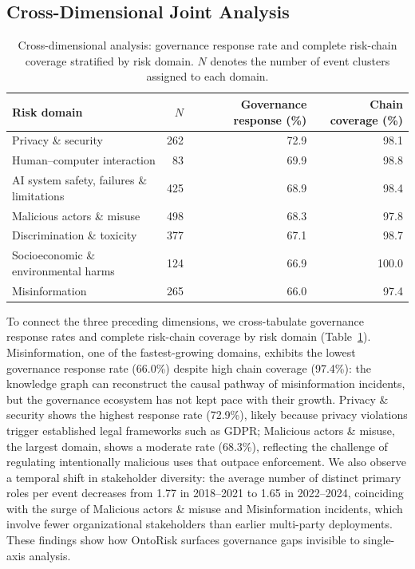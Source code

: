 \documentclass[a4paper,fleqn]{cas-dc}
\begin{document}
\subsection{Cross-Dimensional Joint Analysis}
\label{sec:cross_dimension}

\begin{table}[tp]
\centering
\caption{Cross-dimensional analysis: governance response rate and complete
risk-chain coverage stratified by risk domain. $N$ denotes the number
of event clusters assigned to each domain.}
\label{tab:cross_dimension}
\footnotesize
\setlength{\tabcolsep}{4pt}
\begin{tabular}{lrrr}
\toprule
\textbf{Risk domain} & \textbf{$N$} & \textbf{Governance response (\%)} & \textbf{Chain coverage (\%)} \\
\midrule
Privacy \& security & 262 & 72.9 & 98.1 \\
Human--computer interaction & 83 & 69.9 & 98.8 \\
AI system safety, failures \& limitations & 425 & 68.9 & 98.4 \\
Malicious actors \& misuse & 498 & 68.3 & 97.8 \\
Discrimination \& toxicity & 377 & 67.1 & 98.7 \\
Socioeconomic \& environmental harms & 124 & 66.9 & 100.0 \\
Misinformation & 265 & 66.0 & 97.4 \\
\bottomrule
\end{tabular}
\end{table}

To connect the three preceding dimensions, we cross-tabulate governance
response rates and complete risk-chain coverage by risk domain
(Table~\ref{tab:cross_dimension}).
Misinformation, one of the fastest-growing domains, exhibits the lowest
governance response rate (66.0\%) despite high chain coverage (97.4\%):
the knowledge graph can reconstruct the causal pathway of
misinformation incidents, but the governance ecosystem has not kept
pace with their growth.
Privacy \& security shows the highest response rate (72.9\%), likely
because privacy violations trigger established legal frameworks such
as GDPR; Malicious actors \& misuse, the largest domain, shows a
moderate rate (68.3\%), reflecting the challenge of regulating
intentionally malicious uses that outpace enforcement.
We also observe a temporal shift in stakeholder diversity: the average
number of distinct primary roles per event decreases from 1.77 in
2018--2021 to 1.65 in 2022--2024, coinciding with the surge of
Malicious actors \& misuse and Misinformation incidents, which involve
fewer organizational stakeholders than earlier multi-party deployments.
These findings show how OntoRisk surfaces governance gaps invisible to
single-axis analysis.
\end{document}
